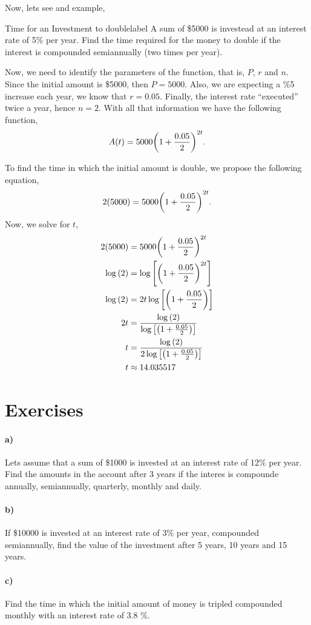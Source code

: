 \documentclass[../main.tex]{subfiles}
\begin{document}
Now, lets see and example,
\begin{example}{Time for an Investment to double}{label}
A sum of \$5000 is investead at an interest rate of 5\% per year.
Find the time required for the money to double if the interest is compounded semiannually (two times per year).

Now, we need to identify the parameters of the function, that is, $P$, $r$ and $n$.
Since the initial amount is \$5000, then $P=5000$. 
Also, we are expecting a \%5 increase each year, we know that $r=0.05$.
Finally, the interest rate ``executed'' twice a year, hence $n=2$.
With all that information we have the following function,
\begin{gather*}
    A(t) = 5000\qty(1+\frac{0.05}{2})^{2t}.
\end{gather*}

To find the time in which the initial amount is double, we propose the following equation,
\begin{gather*}
    2(5000) = 5000\qty(1+\frac{0.05}{2})^{2t}.
\end{gather*}
Now, we solve for $t$,
\begin{align*}
    2(5000)& = 5000\qty(1+\frac{0.05}{2})^{2t} \\
    \log\qty(2) &= \log\qty[\qty(1+\frac{0.05}{2})^{2t}] \\
    \log\qty(2) &= 2t\log\qty[\qty(1+\frac{0.05}{2})] \\
             2t &= \frac{\log\qty(2)}{\log\qty[\qty(1+\frac{0.05}{2})]} \\
             t &= \frac{\log\qty(2)}{2\log\qty[\qty(1+\frac{0.05}{2})]} \\
             t &\approx 14.035517
\end{align*}


\end{example}


\section{Exercises}

\paragraph{a)} Lets assume that a sum of \$1000 is invested at an interest rate of 12\% per year.
Find the amounts in the account after 3 years if the interes is compounde annually, semiannually, quarterly, monthly and daily.

\paragraph{b)} If \$\num{10000} is invested at an interest rate of 3\% per year, compounded semiannually, find the value of the investment after 5 years, 10 years and 15 years.

\paragraph{c)} Find the time in which the initial amount of money is tripled compounded monthly with an interest rate of 3.8 \%.
\end{document}
